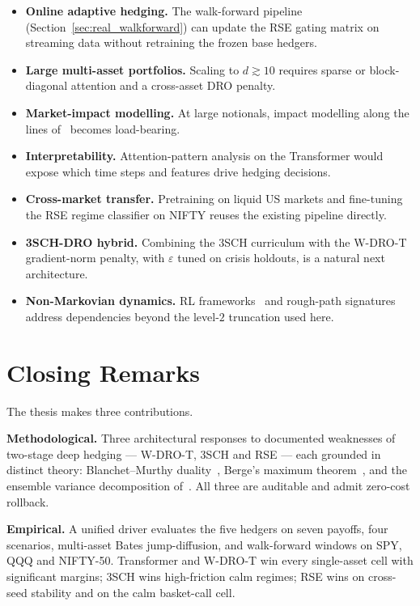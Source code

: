 \documentclass[11pt,oneside]{report}
\begin{document}
\begin{itemize}
  \item \textbf{Online adaptive hedging.} The walk-forward pipeline (Section~\ref{sec:real_walkforward}) can update the RSE gating matrix on streaming data without retraining the frozen base hedgers.
  \item \textbf{Large multi-asset portfolios.} Scaling to $d \gtrsim 10$ requires sparse or block-diagonal attention and a cross-asset DRO penalty.
  \item \textbf{Market-impact modelling.} At large notionals, impact modelling along the lines of~\citet{pickard2025rl} becomes load-bearing.
  \item \textbf{Interpretability.} Attention-pattern analysis on the Transformer would expose which time steps and features drive hedging decisions.
  \item \textbf{Cross-market transfer.} Pretraining on liquid US markets and fine-tuning the RSE regime classifier on NIFTY reuses the existing pipeline directly.
  \item \textbf{3SCH-DRO hybrid.} Combining the 3SCH curriculum with the W-DRO-T gradient-norm penalty, with $\varepsilon$ tuned on crisis holdouts, is a natural next architecture.
  \item \textbf{Non-Markovian dynamics.} RL frameworks~\citep{cao2021deep,haarnoja2018soft,huang2025sac,neagu2025drl} and rough-path signatures~\citep{lyons1998differential,kidger2020signatory} address dependencies beyond the level-$2$ truncation used here.
\end{itemize}


\section{Closing Remarks}
\label{sec:concl_closing}

The thesis makes three contributions.

\textbf{Methodological.} Three architectural responses to documented weaknesses of two-stage deep hedging --- W-DRO-T, 3SCH and RSE --- each grounded in distinct theory: Blanchet--Murthy duality~\citep{blanchet2019quantifying,esfahani2018data}, Berge's maximum theorem~\cite{berge1963topological,aliprantis2006infinite}, and the ensemble variance decomposition of~\citet{dietterich2000ensemble}. All three are auditable and admit zero-cost rollback.

\textbf{Empirical.} A unified driver evaluates the five hedgers on seven payoffs, four scenarios, multi-asset Bates jump-diffusion, and walk-forward windows on SPY, QQQ and NIFTY-50. Transformer and W-DRO-T win every single-asset cell with significant margins; 3SCH wins high-friction calm regimes; RSE wins on cross-seed stability and on the calm basket-call cell.
\end{document}
